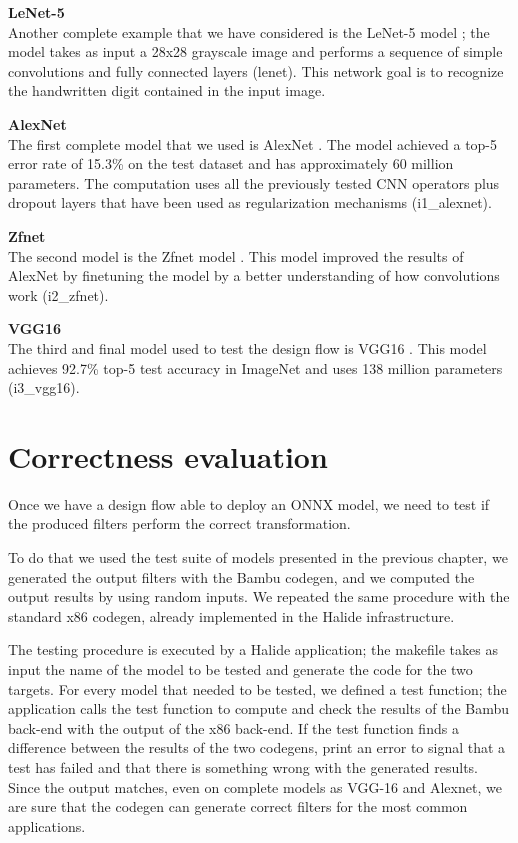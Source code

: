 \documentclass[../main.tex]{subfiles}
\begin{document}
\textbf{LeNet-5}\\
Another complete example that we have considered is the LeNet-5 model \cite{lenet}; the model takes as input a 28x28 grayscale image and performs a sequence of simple convolutions and fully connected layers (lenet).
This network goal is to recognize the handwritten digit contained in the input image.

\newpage


\textbf{AlexNet}\\
The first complete model that we used is AlexNet \cite{alexnet} \cite{venieris2018toolflows}. The model achieved a top-5 error rate of 15.3\% on the test dataset and has approximately 60 million parameters. The computation uses all the previously tested CNN operators plus dropout layers that have been used as regularization mechanisms (i1\_alexnet).

\textbf{Zfnet}\\
The second model is the Zfnet model \cite{zfnet} \cite{venieris2018toolflows}. This model improved the results of AlexNet by finetuning the model by a better understanding of how convolutions work (i2\_zfnet).

\textbf{VGG16}\\
The third and final model used to test the design flow is VGG16 \cite{vgg16} \cite{venieris2018toolflows}. This model achieves 92.7\% top-5 test accuracy in ImageNet and uses 138 million parameters (i3\_vgg16).


\section{Correctness evaluation}
\label {correctness}

Once we have a design flow able to deploy an ONNX model, we need to test if the produced filters perform the correct transformation.

To do that we used the test suite of models presented in the previous chapter, we generated the output filters with the Bambu codegen, and we computed the output results by using random inputs.
We repeated the same procedure with the standard x86 codegen, already implemented in the Halide infrastructure.


The testing procedure is executed by a Halide application; the makefile takes as input the name of the model to be tested and generate the code for the two targets.
For every model that needed to be tested, we defined a test function; the application calls the test function to compute and check the results of the Bambu back-end with the output of the x86 back-end.
If the test function finds a difference between the results of the two codegens, print an error to signal that a test has failed and that there is something wrong with the generated results.
Since the output matches, even on complete models as VGG-16 and Alexnet, we are sure that the codegen can generate correct filters for the most common applications.
\end{document}

